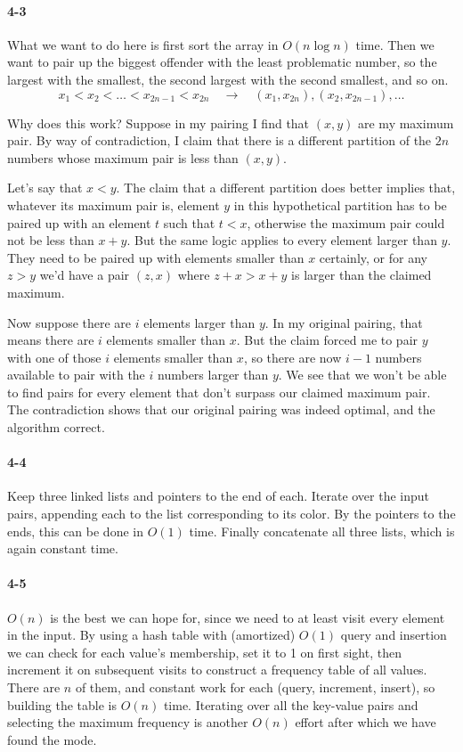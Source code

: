 \documentclass{report}
\begin{document}
\paragraph{4-3} What we want to do here is first sort the array in $O(n\log n)$ time. Then we want to pair up the biggest offender with the least problematic number, so the largest with the smallest, the second largest with the second smallest, and so on.
\[ x_1 < x_2 < \ldots < x_{2n-1} < x_{2n} \quad\to\quad (x_1, x_{2n}), (x_2, x_{2n-1}), \ldots \]

Why does this work? Suppose in my pairing I find that $(x,y)$ are my maximum pair. By way of contradiction, I claim that there is a different partition of the $2n$ numbers whose maximum pair is less than $(x,y)$.

Let's say that $x<y$. The claim that a different partition does better implies that, whatever its maximum pair is, element $y$ in this hypothetical partition has to be paired up with an element $t$ such that $t<x$, otherwise the maximum pair could not be less than $x+y$. But the same logic applies to every element larger than $y$. They need to be paired up with elements smaller than $x$ certainly, or for any $z>y$ we'd have a pair $(z,x)$ where $z+x > x+y$ is larger than the claimed maximum.

Now suppose there are $i$ elements larger than $y$. In my original pairing, that means there are $i$ elements smaller than $x$. But the claim forced me to pair $y$ with one of those $i$ elements smaller than $x$, so there are now $i-1$ numbers available to pair with the $i$ numbers larger than $y$. We see that we won't be able to find pairs for every element that don't surpass our claimed maximum pair. The contradiction shows that our original pairing was indeed optimal, and the algorithm correct.

\paragraph{4-4} Keep three linked lists and pointers to the end of each. Iterate over the input pairs, appending each to the list corresponding to its color. By the pointers to the ends, this can be done in $O(1)$ time. Finally concatenate all three lists, which is again constant time.

\paragraph{4-5} $O(n)$ is the best we can hope for, since we need to at least visit every element in the input. By using a hash table with (amortized) $O(1)$ query and insertion we can check for each value's membership, set it to 1 on first sight, then increment it on subsequent visits to construct a frequency table of all values. There are $n$ of them, and constant work for each (query, increment, insert), so building the table is $O(n)$ time. Iterating over all the key-value pairs and selecting the maximum frequency is another $O(n)$ effort after which we have found the mode.
\end{document}
